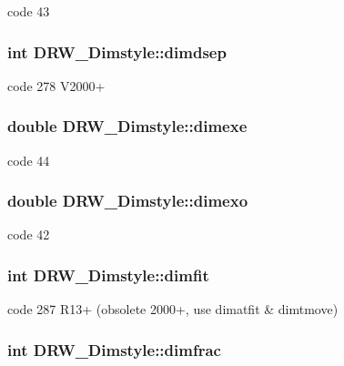 code 43 \hypertarget{classDRW__Dimstyle_a55bca8cbe1928c4f9cbde1c07041c121}{
\subsubsection[{dimdsep}]{\setlength{\rightskip}{0pt plus 5cm}int D\-R\-W\-\_\-\-Dimstyle\-::dimdsep}}\label{classDRW__Dimstyle_a55bca8cbe1928c4f9cbde1c07041c121}
code 278 V2000+ \hypertarget{classDRW__Dimstyle_af1d89fe302b0147db6db850a6382b743}{
\subsubsection[{dimexe}]{\setlength{\rightskip}{0pt plus 5cm}double D\-R\-W\-\_\-\-Dimstyle\-::dimexe}}\label{classDRW__Dimstyle_af1d89fe302b0147db6db850a6382b743}
code 44 \hypertarget{classDRW__Dimstyle_a22b63c5e53a889bfd549cc476e5bdd4a}{
\subsubsection[{dimexo}]{\setlength{\rightskip}{0pt plus 5cm}double D\-R\-W\-\_\-\-Dimstyle\-::dimexo}}\label{classDRW__Dimstyle_a22b63c5e53a889bfd549cc476e5bdd4a}
code 42 \hypertarget{classDRW__Dimstyle_a6ea2dea32359478e0b37777f679d212c}{
\subsubsection[{dimfit}]{\setlength{\rightskip}{0pt plus 5cm}int D\-R\-W\-\_\-\-Dimstyle\-::dimfit}}\label{classDRW__Dimstyle_a6ea2dea32359478e0b37777f679d212c}
code 287 R13+ (obsolete 2000+, use dimatfit \& dimtmove) \hypertarget{classDRW__Dimstyle_aa1c69e4b8d22cc906db95161d110d115}{
\subsubsection[{dimfrac}]{\setlength{\rightskip}{0pt plus 5cm}int D\-R\-W\-\_\-\-Dimstyle\-::dimfrac}}\label{classDRW__Dimstyle_aa1c69e4b8d22cc906db95161d110d115}

